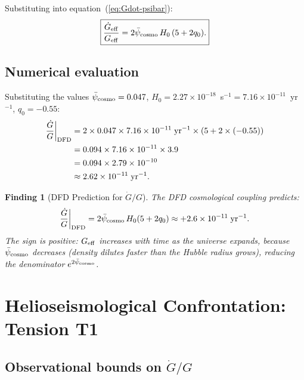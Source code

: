 \documentclass[aps,prd,twocolumn,superscriptaddress,nofootinbib,longbibliography]{revtex4-2}
\newcommand{\psibar}{\bar{\psi}}
\newcommand{\ee}[1]{\times 10^{#1}}
\newtheorem{finding}{Finding}
\begin{document}
Substituting into equation~(\ref{eq:Gdot-psibar}):
\begin{equation}
\boxed{
\frac{\dot{G}_{\rm eff}}{G_{\rm eff}} = 2\psibar_{\rm cosmo}\,H_0\,(5 + 2q_0).
}
\label{eq:Gdot-formula}
\end{equation}

\subsection{Numerical evaluation}

Substituting the values $\psibar_{\rm cosmo} = 0.047$,
$H_0 = 2.27\ee{-18}$~s$^{-1} = 7.16\ee{-11}$~yr$^{-1}$, $q_0 = -0.55$:
\begin{align}
\frac{\dot{G}}{G}\bigg|_{\rm DFD}
&= 2 \times 0.047 \times 7.16\ee{-11}\;\text{yr}^{-1} \times (5 + 2\times(-0.55))\nonumber\\
&= 0.094 \times 7.16\ee{-11} \times 3.9\nonumber\\
&= 0.094 \times 2.79\ee{-10}\nonumber\\
&\approx 2.62\ee{-11}\;\text{yr}^{-1}.
\label{eq:Gdot-num}
\end{align}

\begin{finding}[DFD Prediction for $\dot{G}/G$]
The DFD cosmological coupling predicts:
\begin{equation}
\frac{\dot{G}}{G}\bigg|_{\rm DFD} = 2\psibar_{\rm cosmo}\,H_0(5+2q_0)
\approx +2.6\ee{-11}\;\text{yr}^{-1}.
\label{eq:Gdot-finding}
\end{equation}
The sign is positive: $G_{\rm eff}$ \emph{increases} with time as the universe
expands, because $\psibar_{\rm cosmo}$ decreases (density dilutes faster than
the Hubble radius grows), reducing the denominator $e^{2\psibar_{\rm cosmo}}$.
\end{finding}

\section{Helioseismological Confrontation: Tension T1}
\label{sec:helio-tension}

\subsection{Observational bounds on $\dot{G}/G$}
\end{document}
